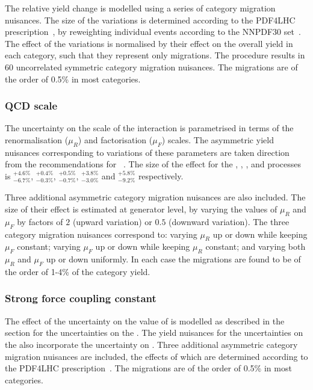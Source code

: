 The relative yield change is modelled using a series of category migration nuisances. The size of the variations is determined according to the PDF4LHC prescription~\cite{Demartin:2010er}, by reweighting individual events according to the NNPDF30 \PDF set~\cite{Carrazza:2015aoa}. The effect of the variations is normalised by their effect on the overall yield in each category, such that they represent only migrations. The procedure results in 60 uncorrelated symmetric category migration nuisances. 
The migrations are of the order of 0.5\% in most categories.

\subsubsection{QCD scale}
The uncertainty on the scale of the \QCD interaction is parametrised in terms of the renormalisation ($\mu_{R}$) and factorisation ($\mu_{F}$) scales. The asymmetric yield nuisances corresponding to variations of these parameters are taken direction from the \LHCHXSWG recommendations for \crosssection\s~\cite{LHCHXSWGYR4}. The size of the effect for the \ggH, \VBF, \WH, \ZH and \ttH processes is $^{+4.6\%}_{-6.7\%}$, $^{+0.4\%}_{-0.3\%}$, $^{+0.5\%}_{-0.7\%}$, $^{+3.8\%}_{-3.0\%}$ and $^{+5.8\%}_{-9.2\%}$ respectively. 

Three additional asymmetric category migration nuisances are also included. The size of their effect is estimated at generator level, by varying the values of $\mu_{R}$ and $\mu_{F}$ by factors of $2$ (upward variation) or $0.5$ (downward variation). The three category migration nuisances correspond to: varying $\mu_{R}$ up or down while keeping $\mu_{F}$ constant; varying $\mu_{F}$ up or down while keeping $\mu_{R}$ constant; and varying both $\mu_{R}$ and $\mu_{F}$ up or down uniformly. In each case the migrations are found to be of the order of 1-4\% of the category yield.


\subsubsection{Strong force coupling constant}
The effect of the uncertainty on the value of \alphaS is modelled as described in the section for the uncertainties on the \PDF\s. The yield nuisances for the uncertainties on the \PDF\s also incorporate the uncertainty on \alphaS. Three additional asymmetric category migration nuisances are included, the effects of which are determined according to the PDF4LHC prescription~\cite{Demartin:2010er}.  
The migrations are of the order of 0.5\% in most categories.

